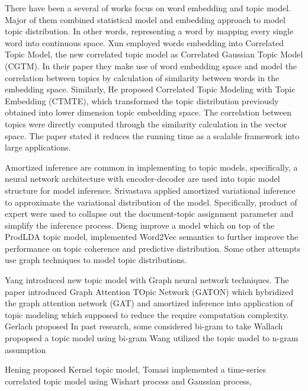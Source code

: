 There have been a several of works focus on word embedding and topic model. Major of them combined statistical model and embedding approach to model topic distribution. In other words, representing a word by mapping every single word into continuous space.
Xun \cite{xun_correlated_2017} employed words embedding into Correlated Topic Model, the new correlated topic model as Correlated Gaussian Topic Model (CGTM). In their paper they make use of word embedding space and model the correlation between topics by calculation of similarity between words in the embedding space.
Similarly, He\cite{he_efficient_2017} proposed Correlated Topic Modeling with Topic Embedding (CTMTE), which transformed the topic distribution previously obtained into lower dimension topic embedding space. The correlation between topics were directly computed through the similarity calculation in the vector space. The paper stated it reduces the running time as a scalable framework into large applications.

Amortized inference\cite{kingma_auto-encoding_2014} are common in implementing to topic models, specifically, a neural network architecture with encoder-decoder are used into topic model structure for model inference.
Srivastava\cite{srivastava_autoencoding_2017} applied amortized variational inference to approximate the variational distribution of the model. Specifically, product of expert were used to collapse out the document-topic assignment parameter and simplify the inference process.
Dieng\cite{dieng_topic_2019} improve a model which on top of the ProdLDA topic model, implemented Word2Vec semantics to further improve the performance on topic coherence and predictive distribution.
Some other attempts use graph techniques to model topic distributions.

Yang\cite{yang_graph_2020} introduced new topic model with Graph neural network techniques. The paper introduced Graph Attention TOpic Network (GATON) which hybridized the graph attention network (GAT) and amortized inference into application of topic modeling which supposed to reduce the require computation complexity.
Gerlach\cite{gerlach_network_2018} proposed
In past research, some considered bi-gram to take 
Wallach propopsed a topic model using bi-gram \cite{wallach_topic_2006}
Wang \cite{wang_topical_2007} utilized the topic model to n-gram assumption

Hening\cite{hennig_kernel_2012} proposed Kernel topic model, 
Tomasi\cite{tomasi_stochastic_nodate} implemented a time-series correlated topic model using Wishart process and Gaussian process, 

